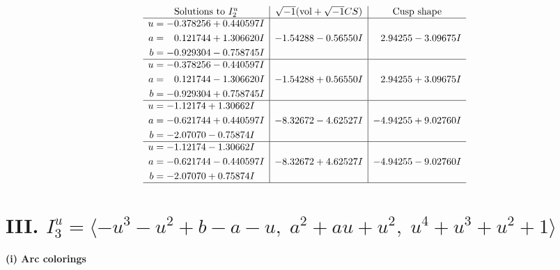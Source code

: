 \documentclass[1p]{elsarticle_modified}
\theoremstyle{definition}
\newcommand{\I}{\sqrt{-1}}
\begin{document}
$$\begin{array}{c|c|c}  
\text{Solutions to }I^u_{2}& \I (\text{vol} + \sqrt{-1}CS) & \text{Cusp shape}\\
 \hline 
\begin{aligned}
u &= -0.378256 + 0.440597 I \\
a &= \phantom{-}0.121744 + 1.306620 I \\
b &= -0.929304 - 0.758745 I\end{aligned}
 & -1.54288 - 0.56550 I & \phantom{-}2.94255 - 3.09675 I \\ \hline\begin{aligned}
u &= -0.378256 - 0.440597 I \\
a &= \phantom{-}0.121744 - 1.306620 I \\
b &= -0.929304 + 0.758745 I\end{aligned}
 & -1.54288 + 0.56550 I & \phantom{-}2.94255 + 3.09675 I \\ \hline\begin{aligned}
u &= -1.12174 + 1.30662 I \\
a &= -0.621744 + 0.440597 I \\
b &= -2.07070 - 0.75874 I\end{aligned}
 & -8.32672 - 4.62527 I & -4.94255 + 9.02760 I \\ \hline\begin{aligned}
u &= -1.12174 - 1.30662 I \\
a &= -0.621744 - 0.440597 I \\
b &= -2.07070 + 0.75874 I\end{aligned}
 & -8.32672 + 4.62527 I & -4.94255 - 9.02760 I\\
 \hline 
 \end{array}$$\newpage\newpage\renewcommand{\arraystretch}{1}
\centering \section*{III. $I^u_{3}= \langle - u^3- u^2+b- a- u,\;a^2+a u+u^2,\;u^4+u^3+u^2+1 \rangle$}
\flushleft \textbf{(i) Arc colorings}\\
\end{document}
